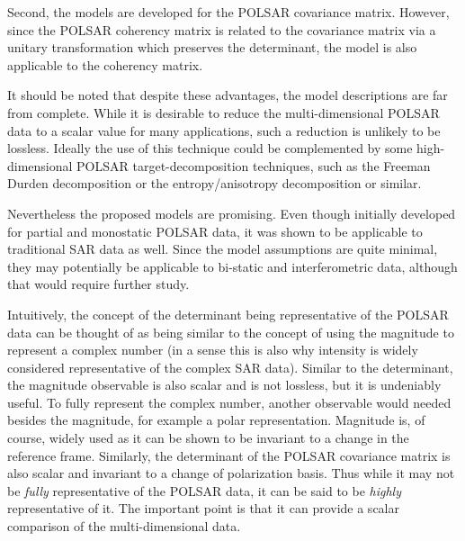 \documentclass[journal]{IEEEtran}
\begin{document}
Second, the models are developed for the POLSAR covariance matrix.
However, since the POLSAR coherency matrix is related to the covariance matrix via a unitary transformation which preserves the determinant,
  the model is also applicable to the coherency matrix.

It should be noted that despite these advantages, the model descriptions are far from complete.
While it is desirable to reduce the multi-dimensional POLSAR data to a scalar value for many applications,
  such a reduction is unlikely to be lossless.  
Ideally %
the use of this technique could be complemented by some high-dimensional POLSAR target-decomposition techniques, such as the Freeman Durden decomposition \cite{Freeman_1998_TGRS_963} or the entropy/anisotropy decomposition \cite{Cloude_1997_TGRS_68} or similar.

Nevertheless the proposed models are promising.
Even though initially developed for partial and monostatic POLSAR data,
  it was shown to be applicable to traditional SAR data as well.
Since the model assumptions are quite minimal, they may potentially be applicable to bi-static and interferometric data, although that would require further study.

Intuitively, the concept of the determinant being representative of the POLSAR data can be thought of as being similar to the concept of using the magnitude to represent a complex number
(in a sense this is also why intensity is widely considered representative of the complex SAR data).
Similar to the determinant, the magnitude observable is also scalar and is not lossless, but it is undeniably useful.
To fully represent the complex number, another observable would needed besides the magnitude, for example a polar representation.
Magnitude is, of course, widely used as it can be shown to be invariant to a change in the reference frame.
Similarly, the determinant of the POLSAR covariance matrix is also scalar and invariant to a change of polarization basis.
Thus while it may not be \textit{fully} representative of the POLSAR data, it can be said to be \textit{highly} representative of it.
The important point is that it can provide a scalar comparison of the multi-dimensional data.
\end{document}

